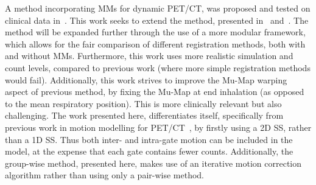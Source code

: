             A method incorporating \glspl{MM} for dynamic \gls{PET}/\gls{CT}, was proposed and tested on clinical data in~\parencite{Chan2018Non-RigidPET}. This work seeks to extend the method, presented in~ and~. The method will be expanded further through the use of a more modular framework, which allows for the fair comparison of different registration methods, both with and without \glspl{MM}. Furthermore, this work uses more realistic simulation and count levels, compared to previous work (where more simple registration methods would fail). Additionally, this work strives to improve the \gls{Mu-Map} warping aspect of previous method, by fixing the \gls{Mu-Map} at end inhalation (as opposed to the mean respiratory position). This is more clinically relevant but also challenging. The work presented here, differentiates itself, specifically from previous work in motion modelling for \gls{PET}/\gls{CT}~\parencite{Chan2018Non-RigidPET}, by firstly using a \gls{2D} \gls{SS}, rather than a \gls{1D} \gls{SS}. Thus both inter- and intra-gate motion can be included in the model, at the expense that each gate contains fewer counts. Additionally, the group-wise method, presented here, makes use of an iterative motion correction algorithm rather than using only a pair-wise method.
        
